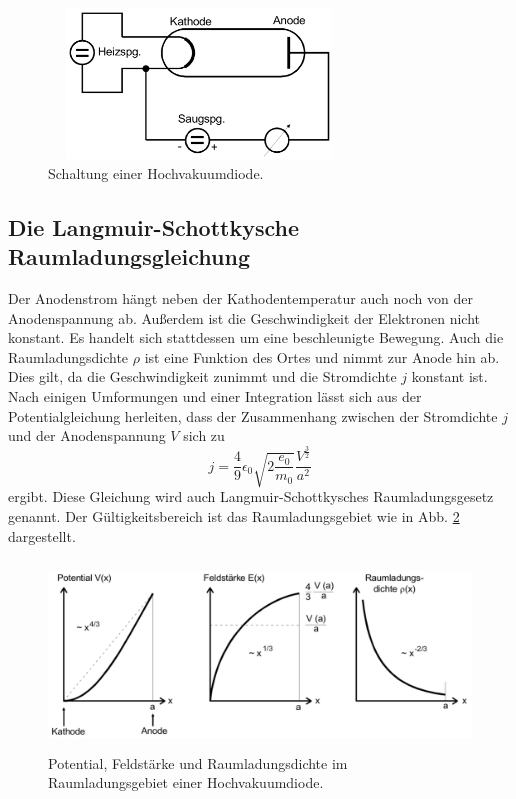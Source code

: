 \begin{figure}
    \centering
    \includegraphics[width=8cm, height=4cm]{build/diode.png}
    \caption{Schaltung einer Hochvakuumdiode. \cite{V504}}
    \label{fig:diode}
\end{figure}

\subsection{Die Langmuir-Schottkysche Raumladungsgleichung}

Der Anodenstrom hängt neben 
der Kathodentemperatur auch noch von der Anodenspannung 
ab. Außerdem ist die Geschwindigkeit der Elektronen nicht 
konstant. Es handelt sich stattdessen um eine beschleunigte 
Bewegung. Auch die Raumladungsdichte $\rho$ ist eine Funktion 
des Ortes und nimmt zur Anode hin ab. Dies gilt, da die 
Geschwindigkeit zunimmt und die Stromdichte $j$ konstant ist. 
Nach einigen Umformungen und einer Integration lässt sich aus 
der Potentialgleichung herleiten, dass der Zusammenhang 
zwischen der Stromdichte $j$ und der Anodenspannung $V$ sich 
zu 
\begin{equation}
    j = \frac{4}{9} \epsilon_0 \sqrt{2 \frac{e_0}{m_0}} \frac{V^{\frac{3}{2}}}{a^2}
    \label{eqn:langmuirschottky}
\end{equation}
ergibt. Diese Gleichung wird auch Langmuir-Schottkysches 
Raumladungsgesetz genannt. Der Gültigkeitsbereich ist das 
Raumladungsgebiet wie in Abb. \ref{fig:langmuirschottky}
dargestellt.  

\begin{figure}
    \centering
    \includegraphics[width=12cm, height=5cm]{build/raumladungsgebiet.png}
    \caption{Potential, Feldstärke und Raumladungsdichte im Raumladungsgebiet
        einer Hochvakuumdiode. \cite{V504}}
    \label{fig:langmuirschottky}
\end{figure}

